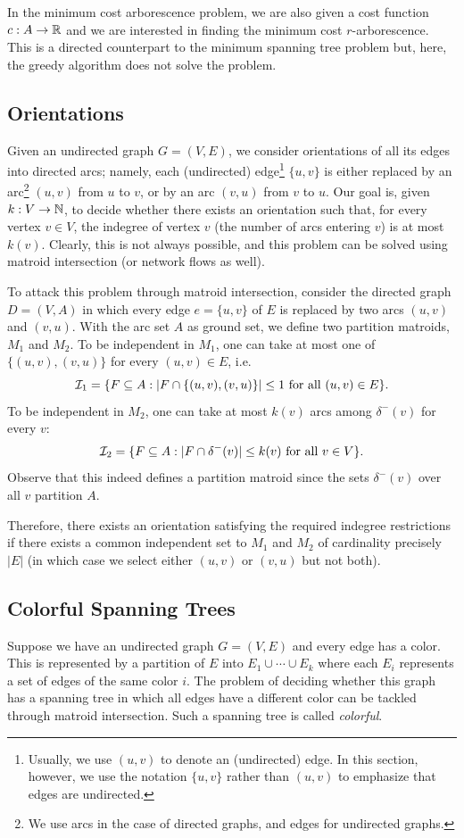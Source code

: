 \documentclass[12pt]{article}
\begin{document}
In the minimum cost arborescence problem, we are also given a cost
function $c: A \rightarrow {\mathbb R}$ and we are interested in finding the
minimum cost $r$-arborescence. This is a directed counterpart to the
minimum spanning tree problem but, here, the greedy algorithm does not
solve the problem.   

\subsection{Orientations}

Given an undirected graph $G=(V,E)$, we consider orientations of all
its edges into directed arcs; namely, each (undirected)
edge\footnote{Usually, we use $(u,v)$ to denote an (undirected)
  edge. In this section, however, we use the notation $\{u,v\}$ rather
  than $(u,v)$ to emphasize that edges are undirected.} $\{u,v\}$
is either replaced by an arc\footnote{We use arcs in the case of
directed graphs, and edges for undirected graphs.}  $(u,v)$ from $u$
to $v$, or by an arc $(v,u)$ from $v$ to $u$. Our goal is, given $k: V
\rightarrow {\mathbb N}$, to decide whether there exists an orientation such
that, for every vertex $v\in V$, the indegree of vertex $v$ (the
number of arcs entering $v$) is at most $k(v)$. Clearly, this is not
always possible, and this problem can be solved using matroid
intersection (or network flows as well).

To attack this problem through matroid intersection, consider the
directed graph $D=(V,A)$ in which every edge $e=\{u,v\}$ of $E$ is
replaced by two arcs $(u,v)$ and $(v,u)$. With the arc set $A$ as
ground set, we define two partition matroids, $M_1$ and $M_2$. To be
independent in $M_1$, one can take at most one of $\{(u,v),(v,u)\}$
for every $(u,v)\in E$, i.e.
$${\cal I}_1=\{F\subseteq A: |F\cap \{(u,v),(v,u)\}|\leq 1 \mbox{ for
  all } (u,v)\in E\}.$$
To be independent in $M_2$, one can take at
most $k(v)$ arcs among $\delta^-(v)$ for every $v$:
$${\cal I}_2=\{F\subseteq A: |F\cap \delta^-(v)|\leq k(v) \mbox{ for
  all } v\in V\}.$$ Observe that this indeed defines a partition
  matroid since the sets $\delta^-(v)$ over all $v$ partition $A$. 

Therefore, there exists an orientation satisfying the required
indegree restrictions if there exists a common independent set to
$M_1$ and $M_2$ of cardinality precisely $|E|$ (in which case we select
either $(u,v)$ or $(v,u)$ but not both).  

\subsection{Colorful Spanning Trees}
Suppose we have an undirected graph $G=(V,E)$ and every edge has a
color. This is represented by a partition of $E$ into $E_1\cup \cdots
\cup E_k$ where each $E_i$ represents a set of edges of the same
color $i$. The problem of deciding whether this graph has a spanning tree
in which all edges have a different color can be tackled through
matroid intersection. Such a spanning tree is called {\it colorful}. 
\end{document}
